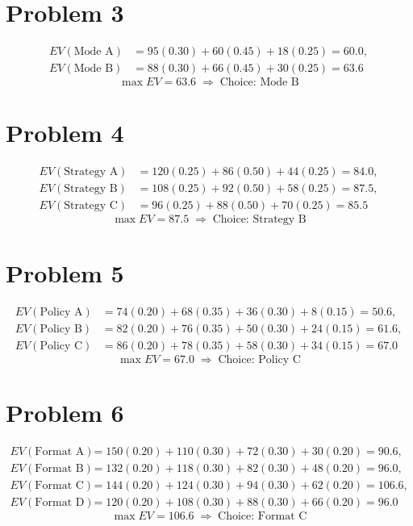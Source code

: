 	\section*{Problem 3}
	\[
	\begin{aligned}
	EV(\text{Mode A}) &= 95(0.30)+60(0.45)+18(0.25)=60.0,\\
	EV(\text{Mode B}) &= 88(0.30)+66(0.45)+30(0.25)=63.6
	\end{aligned}
	\]
	\[
	\max EV = 63.6 \;\Rightarrow\; \text{Choice: Mode B}
	\]

	\section*{Problem 4}
	\[
	\begin{aligned}
	EV(\text{Strategy A}) &= 120(0.25)+86(0.50)+44(0.25)=84.0,\\
	EV(\text{Strategy B}) &= 108(0.25)+92(0.50)+58(0.25)=87.5,\\
	EV(\text{Strategy C}) &= 96(0.25)+88(0.50)+70(0.25)=85.5
	\end{aligned}
	\]
	\[
	\max EV = 87.5 \;\Rightarrow\; \text{Choice: Strategy B}
	\]

	\section*{Problem 5}
	\[
	\begin{aligned}
	EV(\text{Policy A}) &= 74(0.20)+68(0.35)+36(0.30)+8(0.15)=50.6,\\
	EV(\text{Policy B}) &= 82(0.20)+76(0.35)+50(0.30)+24(0.15)=61.6,\\
	EV(\text{Policy C}) &= 86(0.20)+78(0.35)+58(0.30)+34(0.15)=67.0
	\end{aligned}
	\]
	\[
	\max EV = 67.0 \;\Rightarrow\; \text{Choice: Policy C}
	\]

	\section*{Problem 6}
	\[
	\begin{aligned}
	EV(\text{Format A}) &= 150(0.20)+110(0.30)+72(0.30)+30(0.20)=90.6,\\
	EV(\text{Format B}) &= 132(0.20)+118(0.30)+82(0.30)+48(0.20)=96.0,\\
	EV(\text{Format C}) &= 144(0.20)+124(0.30)+94(0.30)+62(0.20)=106.6,\\
	EV(\text{Format D}) &= 120(0.20)+108(0.30)+88(0.30)+66(0.20)=96.0
	\end{aligned}
	\]
	\[
	\max EV = 106.6 \;\Rightarrow\; \text{Choice: Format C}
	\]

